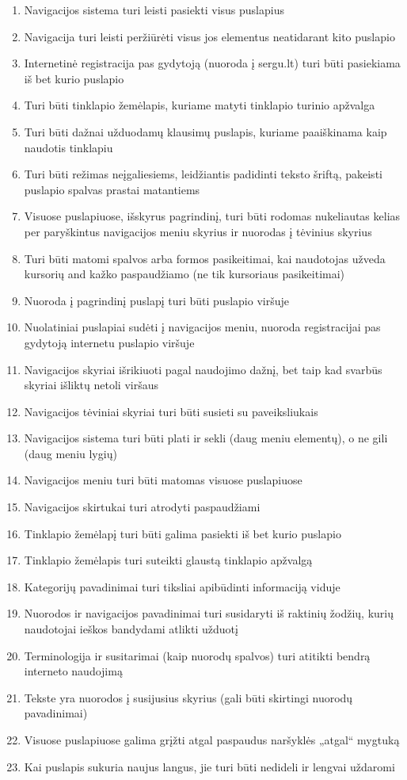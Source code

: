\documentclass{VUMIFPSbakalaurinis}
\begin{document}
\begin{enumerate}
	\item Navigacijos sistema turi leisti pasiekti visus puslapius
	\item Navigacija turi leisti peržiūrėti visus jos elementus neatidarant kito puslapio
	\item Internetinė registracija pas gydytoją (nuoroda į sergu.lt) turi būti pasiekiama iš bet kurio puslapio
	\item Turi būti tinklapio žemėlapis, kuriame matyti tinklapio turinio apžvalga
	\item Turi būti dažnai užduodamų klausimų puslapis, kuriame paaiškinama kaip naudotis tinklapiu
	\item Turi būti režimas neįgaliesiems, leidžiantis padidinti teksto šriftą, pakeisti puslapio spalvas prastai matantiems
	\item Visuose puslapiuose, išskyrus pagrindinį, turi būti rodomas nukeliautas kelias per paryškintus navigacijos meniu skyrius ir nuorodas į tėvinius skyrius
	\item Turi būti matomi spalvos arba formos pasikeitimai, kai naudotojas užveda kursorių and kažko paspaudžiamo (ne tik kursoriaus pasikeitimai)
	\item Nuoroda į pagrindinį puslapį turi būti puslapio viršuje
	\item Nuolatiniai puslapiai sudėti į navigacijos meniu, nuoroda registracijai pas gydytoją internetu puslapio viršuje
	\item Navigacijos skyriai išrikiuoti pagal naudojimo dažnį, bet taip kad svarbūs skyriai išliktų netoli viršaus
	\item Navigacijos tėviniai skyriai turi būti susieti su paveiksliukais
	\item Navigacijos sistema turi būti plati ir sekli (daug meniu elementų), o ne gili (daug meniu lygių)
	\item Navigacijos meniu turi būti matomas visuose puslapiuose
	\item Navigacijos skirtukai turi atrodyti paspaudžiami
	\item Tinklapio žemėlapį turi būti galima pasiekti iš bet kurio puslapio
	\item Tinklapio žemėlapis turi suteikti glaustą tinklapio apžvalgą
	\item Kategorijų pavadinimai turi tiksliai apibūdinti informaciją viduje
	\item Nuorodos ir navigacijos pavadinimai turi susidaryti iš raktinių žodžių, kurių naudotojai ieškos bandydami atlikti užduotį
	\item Terminologija ir susitarimai (kaip nuorodų spalvos) turi atitikti bendrą interneto naudojimą
	\item Tekste yra nuorodos į susijusius skyrius (gali būti skirtingi nuorodų pavadinimai)
	\item Visuose puslapiuose galima grįžti atgal paspaudus naršyklės „atgal“ mygtuką
	\item Kai puslapis sukuria naujus langus, jie turi būti nedideli ir lengvai uždaromi
\end{enumerate}
\end{document}
